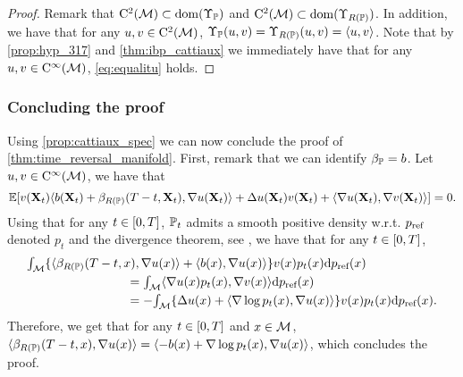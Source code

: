   \begin{proof}
  Remark that $\mathrm{C}^2(\mathcal M) \subset \mathrm{dom}(\Upsilon_{\mathbb{P}})$ and
  $\mathrm{C}^2(\mathcal M) \subset \mathrm{dom}(\Upsilon_{R(\mathbb{P})})$. In addition, we have that for any
  $u,v \in \mathrm{C}^2(\mathcal M)$,
  $\Upsilon_{\mathbb{P}}(u,v) = \Upsilon_{R(\mathbb{P})}(u,v) = \langle u, v \rangle$. Note that
  by \cref{prop:hyp_317} and \cref{thm:ibp_cattiaux} we immediately have that
  for any $u, v \in \mathrm{C}^\infty(\mathcal M)$, \eqref{eq:equalitu} holds.    
  \end{proof}
\subsubsection{Concluding the proof}
\label{sec:concluding-proof}

Using \cref{prop:cattiaux_spec} we can now conclude the proof of \cref{thm:time_reversal_manifold}.
First, remark that we can identify $\beta_{\mathbb{P}} = b$. Let $u, v \in \mathrm{C}^\infty(\mathcal M)$, we have that 
    \begin{equation}
      \label{eq:equality_fin}
      \mathbb{E} [ v(\mathbf{X}_t) \langle b(\mathbf{X}_t) + \beta_{R(\mathbb{P})}(T-t, \mathbf{X}_t), \nabla u(\mathbf{X}_t) \rangle + \Delta u(\mathbf{X}_t) v(\mathbf{X}_t)+ \langle \nabla u(\mathbf{X}_t), \nabla v(\mathbf{X}_t) \rangle ] = 0  . 
    \end{equation}
    Using that for any $t \in \left[0,T\right]$, $\mathbb{P}_t$ admits a smooth positive
    density w.r.t. $p_{\textup{ref}}$ denoted $p_t$ and the divergence theorem, see
    \citep[p.51]{lee2018introduction}, we have that for any $t \in \left[0,T\right]$,
\begin{align}
  &    \textstyle{\int_{\mathcal M} \{ \langle \beta_{R(\mathbb{P})}(T-t, x), \nabla u(x) \rangle + \langle b(x), \nabla u(x) \rangle \} v(x) p_t(x) \mathrm{d}p_{\textup{ref}}(x)} \\
    & \qquad \qquad \qquad \qquad = \textstyle{\int_\mathcal M\langle \nabla u(x) p_t(x), \nabla v(x) \rangle \mathrm{d}p_{\textup{ref}}(x) } \\
   & \qquad \qquad \qquad \qquad = - \textstyle{\int_\mathcal M\{ \Delta u (x) + \langle \nabla \log p_t(x), \nabla u(x) \rangle \} v(x) p_t(x)\mathrm{d}p_{\textup{ref}}(x) }  . 
\end{align}
Therefore, we get that for any $t \in \left[0,T\right]$ and $x \in \mathcal M$,
$\langle \beta_{R(\mathbb{P})}(T-t, x), \nabla u(x) \rangle = \langle 
-b(x) + \nabla\log p_t(x), \nabla u(x) \rangle$, which concludes the proof.

    
